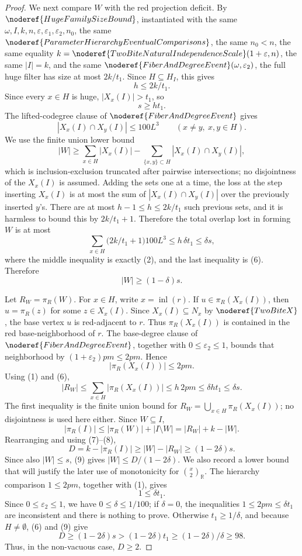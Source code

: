 \begin{proof}
We next compare \(W\) with the red projection deficit.  By
\(\noderef{HugeFamilySizeBound}\), instantiated with the same
\(\omega,I,k,n,\varepsilon,\varepsilon_1,\varepsilon_2,n_0\), the same
\(\noderef{ParameterHierarchyEventualComparisons}\), the same \(n_0<n\), the
same equality \(k=\noderef{TwoBiteNaturalIndependenceScale}(1+\varepsilon,n)\),
the same \(|I|=k\), and the same
\(\noderef{FiberAndDegreeEvent}(\omega,\varepsilon_2)\), the full huge filter
has size at most \(2k/t_1\).  Since \(H\subseteq H_I\), this gives
\[
h\le 2k/t_1. \tag{5}
\]
Since every \(x\in H\) is huge, \(|X_x(I)|>t_1\), so
\[
s\ge h t_1. \tag{6}
\]
The lifted-codegree clause of \(\noderef{FiberAndDegreeEvent}\) gives
\[
|X_x(I)\cap X_y(I)|\le100L^3
\qquad(x\ne y,\ x,y\in H).
\]
We use the finite union lower bound
\[
|W|\ge
\sum_{x\in H}|X_x(I)|
  -\sum_{\{x,y\}\subset H}|X_x(I)\cap X_y(I)|,
\]
which is inclusion-exclusion truncated after pairwise intersections; no
disjointness of the \(X_x(I)\) is assumed.
Adding the sets one at a time, the loss at the step inserting \(X_x(I)\) is at
most the sum of \(|X_x(I)\cap X_y(I)|\) over the previously inserted
\(y\)'s.  There are at most \(h-1\le h\le2k/t_1\) such previous sets, and it
is harmless to bound this by \(2k/t_1+1\).  Therefore the total overlap lost in
forming \(W\) is at most
\[
\sum_{x\in H}\bigl(2k/t_1+1\bigr)100L^3
\le h\,\delta t_1
\le \delta s,
\]
where the middle inequality is exactly (2), and the last inequality is (6).
Therefore
\[
|W|\ge(1-\delta)s. \tag{7}
\]

Let \(R_W=\pi_R(W)\).  For \(x\in H\), write \(x=\operatorname{inl}(r)\).
If \(u\in\pi_R(X_x(I))\), then \(u=\pi_R(z)\) for some
\(z\in X_x(I)\).  Since \(X_x(I)\subseteq N_x\) by \(\noderef{TwoBiteX}\),
the base vertex \(u\) is red-adjacent to \(r\).  Thus
\(\pi_R(X_x(I))\) is contained in the red base-neighborhood of \(r\).
The base-degree clause of \(\noderef{FiberAndDegreeEvent}\), together with
\(0\le\varepsilon_2\le1\), bounds that neighborhood by
\((1+\varepsilon_2)pm\le2pm\).  Hence
\[
|\pi_R(X_x(I))|\le2pm. \tag{8a}
\]
Using (1) and (6),
\[
|R_W|\le\sum_{x\in H}|\pi_R(X_x(I))|
\le h\,2pm
\le \delta h t_1
\le \delta s. \tag{8}
\]
The first inequality is the finite union bound for
\(R_W=\bigcup_{x\in H}\pi_R(X_x(I))\); no disjointness is used here either.
Since \(W\subseteq I\),
\[
|\pi_R(I)|\le |\pi_R(W)|+|I\setminus W|
  = |R_W|+k-|W|.
\]
Rearranging and using (7)--(8),
\[
D=k-|\pi_R(I)|\ge |W|-|R_W|
\ge (1-2\delta)s. \tag{9}
\]
Since also \(|W|\le s\), (9) gives \(|W|\le D/(1-2\delta)\).  We also record
a lower bound that will justify the later use of monotonicity for
\(\binom{x}{2}_{\mathbb R}\).
The hierarchy comparison \(1\le2pm\), together with (1), gives
\[
1\le \delta t_1.
\]
Since \(0\le\varepsilon_2\le1\), we have \(0\le\delta\le1/100\); if
\(\delta=0\), the inequalities \(1\le2pm\le\delta t_1\) are inconsistent and
there is nothing to prove.  Otherwise \(t_1\ge1/\delta\), and because
\(H\ne\emptyset\), (6) and (9) give
\[
D\ge (1-2\delta)s>(1-2\delta)t_1
\ge (1-2\delta)/\delta\ge 98.
\]
Thus, in the non-vacuous case, \(D\ge2\).


\end{proof}
